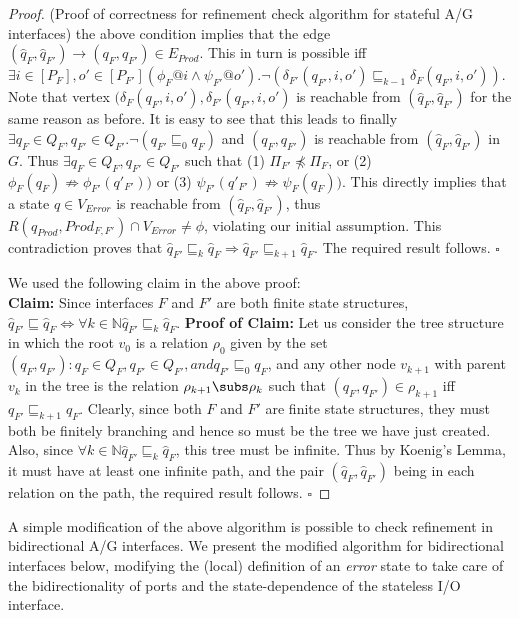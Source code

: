 \begin{proof}{(Proof of correctness for refinement check algorithm for 
stateful A/G interfaces)}
the above condition implies that  the edge $(\hat{q}_F,\hat{q}_{F'}) 
\rightarrow (q_F,q_{F'}) \in E_{Prod}$.
This in turn is possible iff $\exists i \in [P_F], o' \in [P_{F'}] 
(\phi_F @ i \land \psi_{F'} @ o'). \lnot (\delta_{F'}(q_{F'},i,o') 
\sqsubseteq_{k-1} \delta_F(q_F,i,o'))$. Note that vertex 
$(\delta_F(q_F,i,o'), \delta_{F'}(q_{F'},i,o')$ is reachable from
$(\hat{q}_F,\hat{q}_{F'})$ for the same reason as before.
It is easy to see that this leads to finally $\exists q_F \in Q_F, 
q_{F'} \in Q_{F'}. \lnot(q_{F'} \sqsubseteq_0 q_F)$ and $(q_F,q_{F'})$
is reachable from $(\hat{q}_F,\hat{q}_{F'})$ in $G$.
Thus $\exists q_F \in Q_F, q_{F'} \in Q_{F'}$ such that (1) $\Pi_{F'} 
\npreceq \Pi_F$, or (2) $\phi_F(q_F) \nRightarrow \phi_{F'}(q'_{F'}))$ 
or (3) $\psi_{F'}(q'_{F'}) \nRightarrow \psi_F(q_F))$.
This directly implies that a state $q \in V_{Error}$ is reachable 
from $(\hat{q}_F,\hat{q}_{F'})$, thus $R(\hat{q}_{Prod},Prod_{F,F'}) 
\cap V_{Error} \neq \phi$, violating our initial assumption. This
contradiction proves that $\hat{q}_{F'} \sqsubseteq_k \hat{q}_F 
\Rightarrow \hat{q}_{F'} \sqsubseteq_{k+1} \hat{q}_F$. The required 
result follows. $\square$

We used the following claim in the above proof: \\
{\bf Claim:} Since interfaces $F$ and $F'$ are both finite state structures,
$\hat{q}_{F'} \sqsubseteq \hat{q}_F \iff \forall k \in \mathbb{N} 
\hat{q}_{F'} \sqsubseteq_k \hat{q}_F$.
{\bf Proof of Claim:} Let us consider the tree structure in which the root
$v_0$ is a relation $\rho_0$ given by the set ${(q_F,q_{F'}):q_F \in Q_F, 
q_{F'} \in Q_{F'}, and q_{F'} \sqsubseteq_0 q_F}$, and any other node 
$v_{k+1}$ with parent $v_k$ in the tree is the relation $\rho_{k+1}
\subs \rho_k$ such that $(q_F,q_{F'}) \in \rho_{k+1}$ iff $q_{F'} 
\sqsubseteq_{k+1} q_F$. Clearly, since both $F$ and $F'$ are finite state
structures, they must both be finitely branching and hence so must be the 
tree we have just created. Also, since $\forall k \in \mathbb{N} 
\hat{q}_{F'} \sqsubseteq_k \hat{q}_F$, this tree must be infinite. Thus 
by Koenig's Lemma, it must have at least one infinite path, and the pair
$(\hat{q}_F, \hat{q}_{F'})$ being in each relation on the path, the required 
result follows. $\square$
\end{proof}

A simple modification of the above algorithm is possible to check 
refinement in bidirectional A/G interfaces. We present the modified 
algorithm for bidirectional interfaces below, modifying the
(local) definition of an {\em error} state to take care of the
bidirectionality of ports and the state-dependence of the stateless 
I/O interface. 

